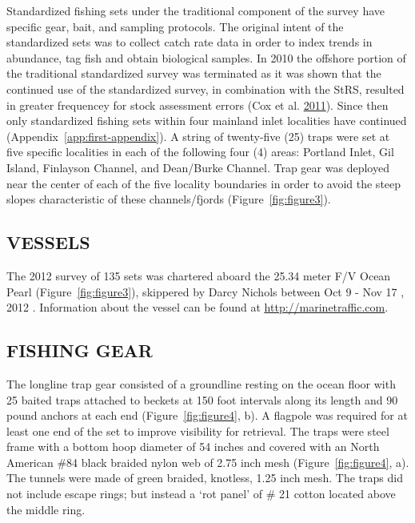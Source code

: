 \documentclass[12pt]{article}\usepackage[]{graphicx}\usepackage[]{color}
\begin{document}
Standardized fishing sets under the traditional component of the survey have specific gear, bait, and sampling protocols. The original intent of the standardized sets was to collect catch rate data in order to index trends in abundance, tag fish and obtain biological samples. In 2010 the offshore portion of the traditional standardized survey was terminated as it was shown that the continued use of the standardized survey, in combination with the StRS, resulted in greater frequencey for stock assessment errors (Cox et al. \protect\hyperlink{ref-Cox2011}{2011}). Since then only standardized fishing sets within four mainland inlet localities have continued (Appendix~\ref{app:first-appendix}). A string of twenty-five (25) traps were set at five specific localities in each of the following four (4) areas: Portland Inlet, Gil Island, Finlayson Channel, and Dean/Burke Channel. Trap gear was deployed near the center of each of the five locality boundaries in order to avoid the steep slopes characteristic of these channels/fjords (Figure~\ref{fig:figure3}).

\hypertarget{vessels}{%
\subsection{VESSELS}\label{vessels}}

The 2012 survey of 135 sets was chartered aboard the 25.34 meter F/V Ocean Pearl (Figure~\ref{fig:figure3}), skippered by Darcy Nichols between Oct 9 - Nov 17 , 2012 . Information about the vessel can be found at \href{http://marinetraffic.com}{\underline{http://marinetraffic.com}}.

\hypertarget{fishing-gear}{%
\subsection{FISHING GEAR}\label{fishing-gear}}

The longline trap gear consisted of a groundline resting on the ocean floor with 25 baited traps attached to beckets at 150 foot intervals along its length and 90 pound anchors at each end (Figure~\ref{fig:figure4}, b). A flagpole was required for at least one end of the set to improve visibility for retrieval. The traps were steel frame with a bottom hoop diameter of 54 inches and covered with an North American \#84 black braided nylon web of 2.75 inch mesh (Figure~\ref{fig:figure4}, a). The tunnels were made of green braided, knotless, 1.25 inch mesh. The traps did not include escape rings; but instead a `rot panel' of \# 21 cotton located above the middle ring.
\end{document}
